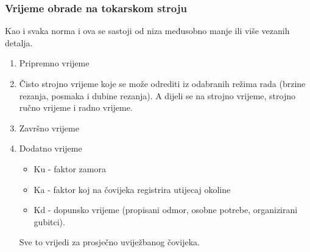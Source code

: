 \documentclass[a4paper,12pt]{article}
\numberwithin{figure}{section}
\begin{document}
\subsubsection{Vrijeme obrade na tokarskom stroju}
Kao i svaka norma i ova se sastoji od niza međusobno manje ili više vezanih detalja.
\begin{enumerate}
\item Pripremno vrijeme
\item Čisto strojno vrijeme koje se može odrediti iz odabranih režima rada (brzine rezanja, posmaka i dubine rezanja). A dijeli se na strojno vrijeme, strojno ručno vrijeme i radno vrijeme.
\item Završno vrijeme
\item Dodatno vrijeme
\begin{itemize}
\item Ku - faktor zamora
\item Ka - faktor koj na čovijeka registrira utijecaj okoline
\item Kd - dopunsko vrijeme (propisani odmor, osobne potrebe, organizirani gubitci).
\end{itemize}
Sve to vrijedi za prosječno uviježbanog čovijeka.
\end{enumerate}
\end{document}
